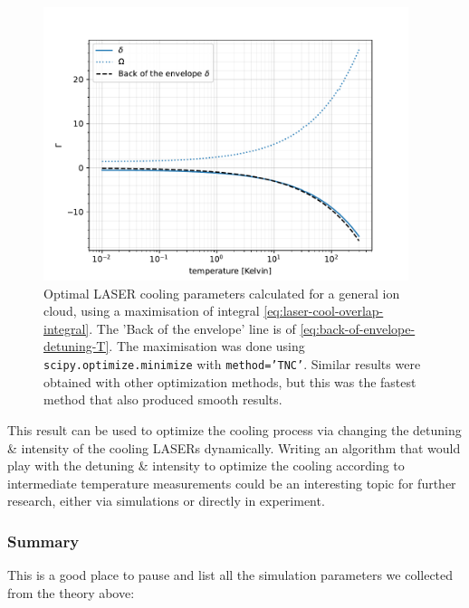 \begin{figure}
	\begin{center}
		\includegraphics[width=0.95\textwidth]{graphics/laser_cool_overlap.pdf}
	\end{center}
	\caption{Optimal LASER cooling parameters calculated for a general ion cloud, using a maximisation of integral \ref{eq:laser-cool-overlap-integral}. The 'Back of the envelope' line is of \ref{eq:back-of-envelope-detuning-T}. The maximisation was done using \texttt{scipy.optimize.minimize} with \texttt{method='TNC'}\cite{scipy}. Similar results were obtained with other optimization methods, but this was the fastest method that also produced smooth results.}
	\label{fig:laser-cool-optimal-overlap}
\end{figure}

This result can be used to optimize the cooling process via changing the detuning \& intensity of the cooling LASERs dynamically. Writing an algorithm that would play with the detuning \& intensity to optimize the cooling according to intermediate temperature measurements could be an interesting topic for further research, either via simulations or directly in experiment.

\subsubsection{Summary}\label{sssec:cooling-summary}

This is a good place to pause and list all the simulation parameters we collected from the theory above:

